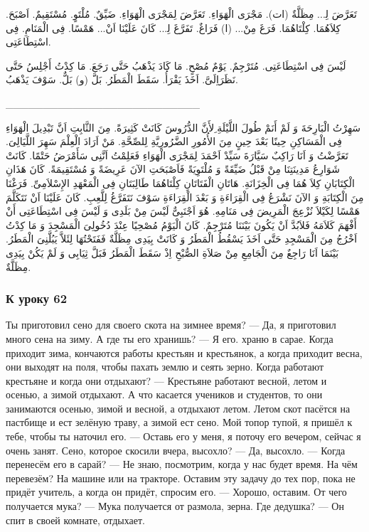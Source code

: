 \documentclass[a5paper]{article}
\begin{document}
تَعَرَّضَ لِ‍... مِظَلَّةٌ (ات). مَجْرَى الْهَوَاءِ. تَعَرَّضَ لِمَجْرَى الْهَوَاءِ. ضَيِّقٌ. مُلْتَوٍ. مُسْتَقِيمٌ. اَصْبَحَ. كِلاَهُمَا. كِلْتَاهُمَا. فَرَغَ مِنْ... (ا) فَرَاغٌ. تَفَرَّغَ لِ‍... كَانَ عَلَيْنَا اَنْ... هَمْسًا. فِى الْمَنَامِ. فِى اسْتِطَاعَتِى. 

لَيْسَ فِى اسْتِطَاعَتِى. مُتَرْجِمٌ. يَوْمٌ مُصْحٍ. مَا كَادَ يَذْهَبُ حَتَّى رَجَعَ. مَا كِدْتُ أَجْلِسُ حَتَّى نَظَرَاِلَىَّ. اَخَذَ يَقْرَأُ. سَقَطَ الْمَطَرُ. بَلَّ (و) بَلٌّ. سَوْفَ يَذْهَبُ.

\_\_\_\_\_\_\_\_\_\_\_\_\_\_\_\_\_\_\_\_\_\_\_\_\_\_

سَهِرْتُ الْبَارِحَةَ وَ لَمْ أَنَمْ طُولَ اللَّيْلَةِ ِلأَنَّ الدُّرُوسَ كَانَتْ كَثِيرَةً. مِنَ الثَّابِتِ اَنَّ تَبْدِيلَ الْهَوَاءِ فِى الْمَسَاكِنِ حِينًا بَعْدَ حِينٍ مِنَ الأُمُورِ الضَّرُورِيَّةِ لِلصِّحَّةِ. مَنْ اَرَادَ الْعِلْمَ سَهِرَ اللَّيَالِىَ. تَعَرَّضْتُ وَ اَنَا رَاكِبٌ سَيَّارَةَ سَيِّدْ اَحْمَدَ لِمَجْرَى الْهَوَاءِ فَعَلِمْتُ اَنَّنِى سَأَمْرَضُ حَتْمًا. كَانَتْ شَوَارِعُ مَدِينَتِنَا مِنْ قَبْلُ ضَيِّقَةً وَ مُلْتَوِيَةً فَاَصْبَحَتِ الآنَ عَرِيضَةً وَ مُسْتَقِيمَةً. كَانَ هَذَانِ الْكِتَابَانِ كِلاَ هُمَا فِى الْخِزَانَةِ. هَاتَانِ الْفَتَاتَانِ كِلْتَاهُمَا طَالِبَتَانِ فِى الْمَعْهَدِ الإِسْلاَمِىِّ. فَرَغْنَا مِنَ الْكِتَابَةِ وَ الآنَ نَشْرَعُ فِى الْقِرَاءَةِ وَ بَعْدَ الْقِرَاءَةِ سَوْفَ نَتَفَرَّغُ لِلَّعِبِ. كَانَ عَلَيْنَا اَنْ نَتَكَلَّمَ هَمْسًا لِكَيْلاَ نُزْعِجَ الْمَرِيضَ فِى مَنَامِهِ. هُوَ اَجْنَبِىٌّ لَيْسَ مِنْ بَلَدِى وَ لَيْسَ فِى اسْتِطَاعَتِى أَنْ أَفْهَمَ كَلاَمَهُ فَلاَبُدَّ اَنْ يَكُونَ بَيْنَنَا مُتَرْجِمٌ. كَانَ الْيَوْمُ مُصْحِيًا عِنْدَ دُخُولِىَ الْمَسْجِدَ وَ مَا كِدْتُ اَخْرُجُ مِنَ الْمَسْجِدِ حَتَّى اَخَذَ يَسْقُطُ الْمَطَرُ وَ كَانَتْ بِيَدِى مِظَلَّةٌ فَفَتَحْتُهَا لِئَلاَّ يَبُلَّنِىَ الْمَطَرُ. بَيْنَمَا اَنَا رَاجِعٌ مِنَ الْجَامِعِ مِنْ صَلاَةِ الصُّبْحِ اِذْ سَقَطَ الْمَطَرُ فَبَلَّ ثِيَابِى وَ لَمْ يَكُنْ بِيَدِى مِظَلَّةٌ.

\subsubsection{К уроку 62}
Ты приготовил сено для своего скота на зимнее время? — Да, я приготовил много сена на зиму. А где ты его хранишь? — Я его. храню в сарае. Когда приходит зима, кончаются работы крестьян и крестьянок, а когда приходит весна, они выходят на поля, чтобы пахать землю и сеять зерно. Когда работают крестьяне и когда они отдыхают? — Крестьяне работают весной, летом и осенью, а зимой отдыхают. А что касается учеников и студентов, то они занимаются осенью, зимой и весной, а отдыхают летом. Летом скот пасётся на пастбище и ест зелёную траву, а зимой ест сено. Мой топор тупой, я пришёл к тебе, чтобы ты наточил его. — Оставь его у меня, я поточу его вечером, сейчас я очень занят. Сено, которое скосили вчера, высохло? — Да, высохло. — Когда перенесём его в сарай? — Не знаю, посмотрим, когда у нас будет время. На чём перевезём? На машине или на тракторе. Оставим эту задачу до тех пор, пока не придёт учитель, а когда он придёт, спросим его. — Хорошо, оставим. От чего получается мука? — Мука получается от размола, зерна. Где дедушка? — Он спит в своей комнате, отдыхает.
\end{document}
